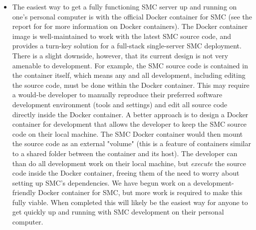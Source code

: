 \documentclass{deliverablereport}
\begin{document}
\begin{itemize}
    \item The easiest way to get a fully functioning SMC server up and running
        on one's personal computer is with the official Docker container for
        SMC (see the report for
         for more
        information on Docker containers).  The Docker container image is
        well-maintained to work with the latest SMC source code, and provides a
        turn-key solution for a full-stack single-server SMC deployment.  There
        is a slight downside, however, that its current design is not very
        amenable to development.  For example, the SMC source code is contained
        in the container itself, which means any and all development, including
        editing the source code, must be done within the Docker container.
        This may require a would-be developer to manually reproduce their
        preferred software development environment (tools and settings) and
        edit all source code directly inside the Docker container.  A better
        approach is to design a Docker container for development that allows
        the developer to keep the SMC source code on their local machine.  The
        SMC Docker container would then mount the source code as an external
        "volume" (this is a feature of containers similar to a shared folder
        between the container and its host).  The developer can than do all
        development work on their local machine, but \emph{execute} the source
        code inside the Docker container, freeing them of the need to worry
        about setting up SMC's dependencies.  We have begun work on a
        development-friendly Docker container for SMC, but more work is
        required to make this fully viable.  When completed this will likely be
        the easiest way for anyone to get quickly up and running with SMC
        development on their personal computer.

\end{itemize}
\end{document}
